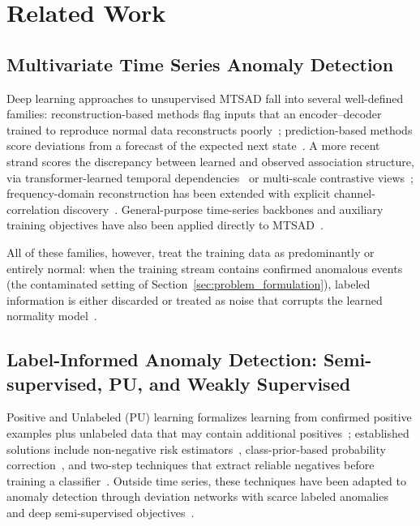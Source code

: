 
\section{Related Work}
\label{sec:related}

\subsection{Multivariate Time Series Anomaly Detection}
\label{sec:related_mtsad}

Deep learning approaches to unsupervised MTSAD fall into several well-defined families: reconstruction-based methods flag inputs that an encoder--decoder trained to reproduce normal data reconstructs poorly~\cite{zong2018dagmm,su2019omnianomaly,audibert2020usad,song2023memto}; prediction-based methods score deviations from a forecast of the expected next state~\cite{deng2021gdn}.
A more recent strand scores the discrepancy between learned and observed association structure, via transformer-learned temporal dependencies~\cite{xu2022anomalytransformer} or multi-scale contrastive views~\cite{yang2023dcdetector}; frequency-domain reconstruction has been extended with explicit channel-correlation discovery~\cite{wu2025catch}.
General-purpose time-series backbones and auxiliary training objectives have also been applied directly to MTSAD~\cite{tuli2022tranad,wu2023timesnet}.

All of these families, however, treat the training data as predominantly or entirely normal: when the training stream contains confirmed anomalous events (the contaminated setting of Section~\ref{sec:problem_formulation}), labeled information is either discarded or treated as noise that corrupts the learned normality model~\cite{wang2025nrdetector}.

\subsection{Label-Informed Anomaly Detection: Semi-supervised, PU, and Weakly Supervised}
\label{sec:related_semi}

Positive and Unlabeled (PU) learning formalizes learning from confirmed positive examples plus unlabeled data that may contain additional positives~\cite{bekker2020pusurvey,duplessis2014pu}; established solutions include non-negative risk estimators~\cite{kiryo2017nnpu}, class-prior-based probability correction~\cite{elkan2008pu}, and two-step techniques that extract reliable negatives before training a classifier~\cite{bekker2020pusurvey}.
Outside time series, these techniques have been adapted to anomaly detection through deviation networks with scarce labeled anomalies~\cite{pang2019devnet} and deep semi-supervised objectives~\cite{ruff2020deepsad}.


